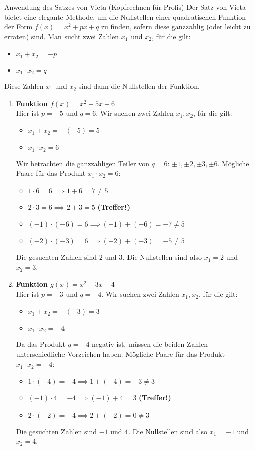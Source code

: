 \begin{loesungsumgebung}{Anwendung des Satzes von Vieta (Kopfrechnen für Profis)}
Der Satz von Vieta bietet eine elegante Methode, um die Nullstellen einer quadratischen Funktion der Form $f(x) = x^2+px+q$ zu finden, sofern diese ganzzahlig (oder leicht zu erraten) sind. Man sucht zwei Zahlen $x_1$ und $x_2$, für die gilt:
\begin{itemize}
    \item $x_1 + x_2 = -p$
    \item $x_1 \cdot x_2 = q$
\end{itemize}
Diese Zahlen $x_1$ und $x_2$ sind dann die Nullstellen der Funktion.

\begin{enumerate}[label=(\alph*)]
    \item \textbf{Funktion $f(x) = x^2 - 5x + 6$} \\
    Hier ist $p=-5$ und $q=6$.
    Wir suchen zwei Zahlen $x_1, x_2$, für die gilt:
    \begin{itemize}
        \item $x_1 + x_2 = -(-5) = 5$
        \item $x_1 \cdot x_2 = 6$
    \end{itemize}
    Wir betrachten die ganzzahligen Teiler von $q=6$: $\pm 1, \pm 2, \pm 3, \pm 6$.
    Mögliche Paare für das Produkt $x_1 \cdot x_2 = 6$:
    \begin{itemize}
        \item $1 \cdot 6 = 6 \implies 1+6 = 7 \neq 5$
        \item $2 \cdot 3 = 6 \implies 2+3 = 5$ \textbf{(Treffer!)}
        \item $(-1) \cdot (-6) = 6 \implies (-1)+(-6) = -7 \neq 5$
        \item $(-2) \cdot (-3) = 6 \implies (-2)+(-3) = -5 \neq 5$
    \end{itemize}
    Die gesuchten Zahlen sind $2$ und $3$.
    Die Nullstellen sind also $x_1 = 2$ und $x_2 = 3$.

    \item \textbf{Funktion $g(x) = x^2 - 3x - 4$} \\
    Hier ist $p=-3$ und $q=-4$.
    Wir suchen zwei Zahlen $x_1, x_2$, für die gilt:
    \begin{itemize}
        \item $x_1 + x_2 = -(-3) = 3$
        \item $x_1 \cdot x_2 = -4$
    \end{itemize}
    Da das Produkt $q=-4$ negativ ist, müssen die beiden Zahlen unterschiedliche Vorzeichen haben.
    Mögliche Paare für das Produkt $x_1 \cdot x_2 = -4$:
    \begin{itemize}
        \item $1 \cdot (-4) = -4 \implies 1+(-4) = -3 \neq 3$
        \item $(-1) \cdot 4 = -4 \implies (-1)+4 = 3$ \textbf{(Treffer!)}
        \item $2 \cdot (-2) = -4 \implies 2+(-2) = 0 \neq 3$
    \end{itemize}
    Die gesuchten Zahlen sind $-1$ und $4$.
    Die Nullstellen sind also $x_1 = -1$ und $x_2 = 4$.


\end{enumerate}
\end{loesungsumgebung}
